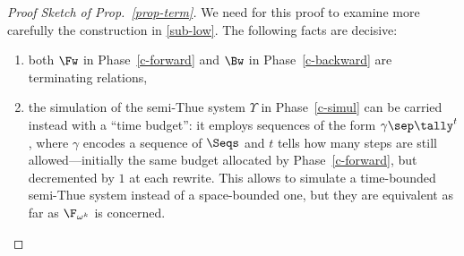 \begin{proof}[Proof Sketch of Prop.~\ref{prop-term}]
  We need for this proof to examine more carefully the construction
  in \autoref{sub-low}.  The following facts are decisive:
  \begin{enumerate}
  \item both $\Fw$ in Phase~\ref{c-forward} and $\Bw$ in
    Phase~\ref{c-backward} are terminating relations,
  \item the simulation of the semi-Thue system $\Upsilon$ in
    Phase~\ref{c-simul} can be
    carried instead with a ``time budget'': it employs sequences of the form
    $\gamma\sep\tally^t$, where $\gamma$ encodes a sequence of $\Seqs$ and
    $t$ tells how many steps are still allowed---initially the same
    budget allocated by Phase~\ref{c-forward}, but
    decremented by $1$ at each rewrite.  This allows to simulate a
    time-bounded semi-Thue system instead of a space-bounded one, but
    they are equivalent as far as $\F_{\omega^k}$ is concerned.
  \end{enumerate}


\end{proof}
